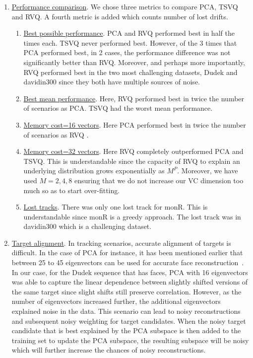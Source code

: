 \begin{enumerate}
\item \underline{Performance comparison}.  We chose three metrics to compare PCA, TSVQ and RVQ.  A fourth metric is added which counts number of lost drifts.
\begin{enumerate}
\item \underline{Best possible performance}.  PCA and RVQ performed best in half the times each.  TSVQ never performed best.  However, of the 3 times that PCA performed best, in 2 cases, the performance difference was not significantly better than RVQ.  Moreover, and perhaps more importantly, RVQ performed best in the two most challenging datasets, Dudek and davidin300 since they both have multiple sources of noise.
\item \underline{Best mean performance}.  Here, RVQ performed best in twice the number of scenarios as PCA.  TSVQ had the worst mean performance.
\item \underline{Memory cost=16 vectors}.  Here PCA performed best in twice the number of scenarios as RVQ .
\item \underline{Memory cost=32 vectors}.  Here RVQ completely outperformed PCA and TSVQ.  This is understandable since the capacity of RVQ to explain an underlying distribution grows exponentially as $M^P$.  Moreover, we have used $M=2, 4, 8$ ensuring that we do not increase our VC dimension too much so as to start over-fitting.
\item \underline{Lost tracks}.  There was only one lost track for monR.  This is understandable since monR is a greedy approach.  The lost track was in davidin300 which is a challenging dataset.
\end{enumerate}

\item \underline{Target alignment}.  In tracking scenarios, accurate alignment of targets is difficult.  In the case of PCA for instance, it has been mentioned earlier that between 25 to 45 eigenvectors can be used for accurate face reconstruction~\cite{1997_JNL_EigenVsFisherFaces_Bel}.  In our case, for the Dudek sequence that has faces, PCA with 16 eigenvectors was able to capture the linear dependence between slightly shifted versions of the same target since slight shifts still preserve correlation.  However, as the number of eigenvectors increased further, the additional eigenvectors explained noise in the data.  This scenario can lead to noisy reconstructions and subsequent noisy weighting for target candidates.  When the noisy target candidate that is best explained by the PCA subspace is then added to the training set to update the PCA subspace, the resulting subspace will be noisy which will further increase the chances of noisy reconstructions.  
\end{enumerate}

